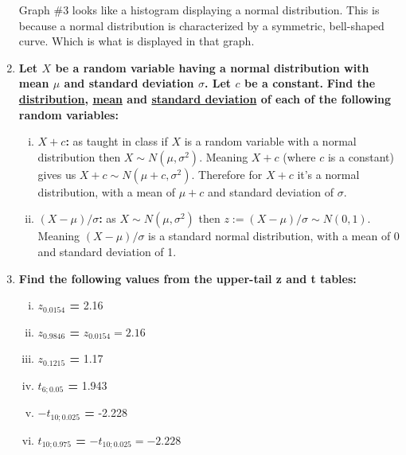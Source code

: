 \documentclass{article}
\begin{document}
\begin{enumerate}[1.]
Graph \#3 looks like a histogram displaying a normal distribution. This is because a normal distribution is characterized by a symmetric, bell-shaped curve. Which is what is displayed in that graph.

\item
\textbf{Let $X$ be a random variable having a normal distribution with mean $\mu$ and standard deviation $\sigma$. Let $c$ be a constant.}
\textbf{Find the \underline{distribution}, \underline{mean} and \underline{standard deviation} of each of the following random variables:}
\begin{enumerate}[(i)]
  \item \textbf{$X + c$: } as taught in class if $X$ is a random variable with a normal distribution then $X \sim N(\mu, \sigma^2)$. Meaning $X + c$ (where $c$ is a constant) gives us $X + c \sim N(\mu + c, \sigma^2)$. Therefore for $X + c$ it's a normal distribution, with a mean of $\mu + c$ and standard deviation of $\sigma$. 
  \item \textbf{$(X - \mu)/\sigma$: } as $X \sim N(\mu, \sigma^2)$ then $z := (X - \mu)/\sigma \sim N(0, 1)$. Meaning $(X - \mu)/\sigma$ is a standard normal distribution, with a mean of 0 and standard deviation of 1.
\end{enumerate}

\item
\textbf{Find the following values from the upper-tail z and t tables:}
\begin{enumerate}[(i)]
  \item \textbf{$z_{0.0154}$ = } 2.16
  \item \textbf{$z_{0.9846}$ = } $z_{0.0154} = 2.16$
  \item \textbf{$z_{0.1215}$ = } 1.17
  \item \textbf{$t_{6;0.05}$ = } 1.943
  \item \textbf{$-t_{10;0.025}$ = } -2.228
  \item \textbf{$t_{10;0.975}$ = } $-t_{10;0.025} = -2.228$ 
\end{enumerate}


\end{enumerate}
\end{document}
